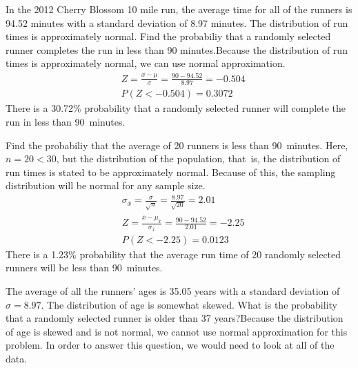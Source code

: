 \begin{examplewrap}
\begin{nexample}{
In the 2012 Cherry Blossom 10 mile run, the average time for all of the runners is 94.52 minutes with a standard deviation of 8.97 minutes. The distribution of run times is approximately normal. Find the probabiliy that a randomly selected runner completes the run in less than 90 minutes.}Because the distribution of run times is approximately normal, we can use normal approximation.
\begin{align*}
&Z = \frac{x - \mu}{\sigma}=\frac{90-94.52}{8.97}=-0.504 \\
&P(Z < -0.504) = 0.3072
\end{align*}
There is a 30.72\% probability that a randomly selected runner will complete the run in less than 90~minutes.
\end{nexample}
\end{examplewrap}

\begin{examplewrap}
\begin{nexample}{
Find the probabiliy that the average of 20 runners is less than 90~minutes.}
Here, $n=20<30$, but the distribution of the population, that~is, the distribution of run times is stated to be approximately normal. Because of this, the sampling distribution will be normal for any sample size.
\begin{align*}
&\sigma_{\bar{x}}=\frac{\sigma}{\sqrt{n}}=\frac{8.97}{\sqrt{20}}=2.01 \\
&Z = \frac{\bar{x} - \mu_{\bar{x}}}{\sigma_{\bar{x}}}=\frac{90-94.52}{2.01}=-2.25\\
&P(Z < -2.25) = 0.0123
\end{align*}
There is a 1.23\% probability that the average run time of 20 randomly selected runners will be less than 90~minutes.
\end{nexample}
\end{examplewrap}

\D{\newpage}

\begin{examplewrap}
\begin{nexample}{
The average of all the runners' ages is 35.05 years with a standard deviation of $\sigma = 8.97$. The distribution of age is somewhat skewed. What is the probability that a randomly selected runner is older than 37 years?}Because the distribution of age is skewed and is not normal, we cannot use normal approximation for this problem. In order to answer this question, we would need to look at all of the data.
\end{nexample}
\end{examplewrap}


